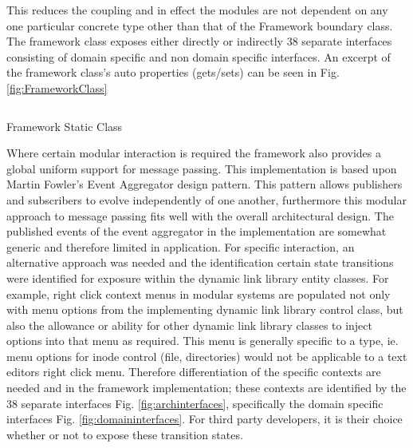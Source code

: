 \newpage
				
		\normalsize
		{			
			This reduces the coupling and in effect the modules are not dependent on any one particular 
			concrete type other than that of the Framework boundary class.  The framework class exposes either directly or indirectly 38 separate interfaces 
			consisting of domain specific and non domain specific interfaces.  
			An excerpt of the framework class's auto properties (gets/sets) can be seen in Fig. \ref{fig:FrameworkClass}
			\newline
		}
		
		\indent\begin{minipage}{\textwidth}
			
			\begin{center}
			\begin{figurehere}
				\centering
				\inputminted[linenos=true,fontsize=\footnotesize,tabsize=2]{csharp}{pages/chapter3/smippets/framework.cs}
				\vspace{-5mm}
				\caption{Framework Static Class}
				\label{fig:FrameworkClass}
			\end{figurehere}	
			\end{center}
		
		\end{minipage}
			
		\vspace{5mm}	
		\normalsize
		{
			Where certain modular interaction is required the framework also provides a global uniform support for message passing.  This implementation 
			is based upon Martin Fowler's Event Aggregator design pattern.  This pattern allows publishers and subscribers to evolve independently of one 
			another, furthermore this modular approach to message passing fits well with the overall architectural design.  
			The published events of the event aggregator in the implementation are somewhat generic and therefore limited in application. 
			\newline
			\newline
			For specific interaction, an alternative approach was needed and the identification certain state transitions were identified 
			for exposure within the dynamic link library entity classes.  
			For example, right click context menus in modular systems are populated not only with menu options 
			from the implementing dynamic link library control class, but also the allowance or ability for other dynamic link library classes 
			to inject options into that menu as required.  
			\newline
			\newline
			This menu is generally specific to a type, ie. menu options for inode control 
			(file, directories) would not be applicable to a text editors right click menu.  Therefore differentiation of the specific 
			contexts are needed and in the framework implementation; these contexts are identified by the 38 separate interfaces Fig. \ref{fig:archinterfaces},
			specifically the domain specific interfaces Fig. \ref{fig:domaininterfaces}.  
			For third party developers, it is their choice whether or not to expose these transition states.
		}

